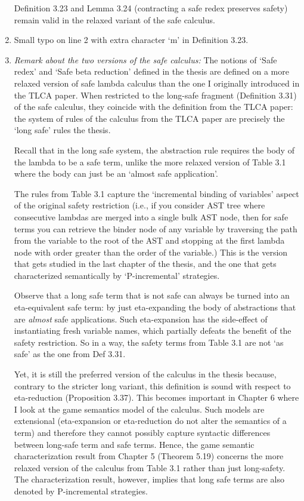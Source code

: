 \documentclass[12pt]{article}
\begin{document}
\begin{enumerate}
Definition 3.23 and Lemma 3.24 (contracting a safe redex preserves safety) remain valid in the relaxed variant of the safe calculus.

\item Small typo on line 2 with extra character `m' in Definition 3.23.

\item \emph{Remark about the two versions of the safe calculus:} The notions of `Safe redex' and `Safe beta reduction' defined in the thesis are defined on
a more relaxed version of safe lambda calculus than the one I originally introduced in the TLCA paper.
When restricted to the long-safe fragment (Definition 3.31) of the safe calculus, they coincide with the definition
from the TLCA paper: the system of rules of the calculus from the TLCA paper are precisely the `long safe' rules the thesis.

Recall that in the long safe system, the abstraction rule requires the body of the lambda to be a safe term,
unlike the more relaxed version of Table 3.1 where the body can just be an `almost safe application'.

The rules from Table 3.1 capture the `incremental binding of variables' aspect of the original safety restriction (i.e., if you consider AST tree
where consecutive lambdas are merged into a single bulk AST node, then for safe terms you can retrieve the binder node of any variable by traversing the path from
the variable to the root of the AST and stopping at the first lambda node with order greater than the order of the variable.)
This is the version that gets studied in the last chapter of the thesis, and
the one that gets characterized semantically by `P-incremental' strategies.

Observe that a long safe term that is not safe can always be turned into an eta-equivalent safe term: by just eta-expanding
the body of abstractions that are \emph{almost} safe applications. Such eta-expansion has the side-effect
 of instantiating fresh variable names, which partially defeats the benefit of the safety restriction.
 So in a way, the safety terms from Table 3.1 are not `as safe' as the one from Def 3.31.

Yet, it is still the preferred version of the calculus in the thesis because, contrary to the stricter long variant, this definition is sound with respect to eta-reduction (Proposition 3.37).
This becomes important in Chapter 6 where I look at the game semantics model of the calculus. Such models are extensional (eta-expansion or eta-reduction do not alter the semantics of a term) and therefore they
cannot possibly capture syntactic differences between long-safe term and safe terms.
Hence, the game semantic characterization result from Chapter 5 (Theorem 5.19) concerns the more relaxed version of
the calculus from Table 3.1 rather than just long-safety.
The characterization result, however, implies that long safe terms are also denoted by P-incremental strategies.


\end{enumerate}
\end{document}
